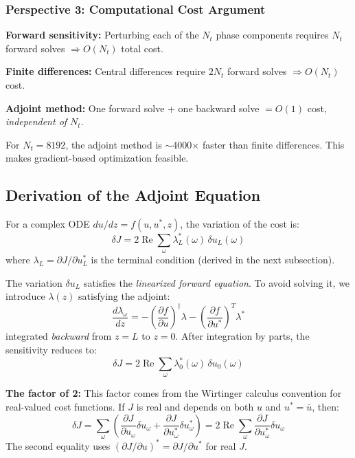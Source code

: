 \documentclass[12pt,a4paper]{article}
\newcommand{\pdv}[2]{\frac{\partial #1}{\partial #2}}
\newcommand{\dv}[2]{\frac{d #1}{d #2}}
\newcommand{\Real}{\operatorname{Re}}
\theoremstyle{definition}
\begin{document}
\subsubsection{Perspective 3: Computational Cost Argument}

\textbf{Forward sensitivity:} Perturbing each of the $N_t$ phase components requires $N_t$ forward solves $\Rightarrow O(N_t)$ total cost.

\textbf{Finite differences:} Central differences require $2N_t$ forward solves $\Rightarrow O(N_t)$ cost.

\textbf{Adjoint method:} One forward solve + one backward solve $= O(1)$ cost, \emph{independent of $N_t$}.

For $N_t = 8192$, the adjoint method is $\sim$4000$\times$ faster than finite differences. This makes gradient-based optimization feasible.

\subsection{Derivation of the Adjoint Equation}
\label{sec:adjoint_derivation}

For a complex ODE $du/dz = f(u, u^*, z)$, the variation of the cost is:
\begin{equation}
\delta J = 2\Real\sum_\omega \lambda_L^*(\omega)\,\delta u_L(\omega)
\end{equation}
where $\lambda_L = \partial J / \partial u_L^*$ is the terminal condition (derived in the next subsection).

The variation $\delta u_L$ satisfies the \emph{linearized forward equation}. To avoid solving it, we introduce $\lambda(z)$ satisfying the adjoint:
\begin{equation}
\boxed{\dv{\lambda_\omega}{z} = -\left(\pdv{f}{u}\right)^\dagger \lambda - \left(\pdv{f}{u^*}\right)^T \lambda^*}
\label{eq:adjoint_general}
\end{equation}
integrated \emph{backward} from $z=L$ to $z=0$. After integration by parts, the sensitivity reduces to:
\begin{equation}
\delta J = 2\Real\sum_\omega \lambda_0^*(\omega)\,\delta u_0(\omega)
\label{eq:sensitivity}
\end{equation}

\textbf{The factor of 2:} This factor comes from the Wirtinger calculus convention for real-valued cost functions. If $J$ is real and depends on both $u$ and $u^* = \bar{u}$, then:
\begin{equation}
\delta J = \sum_\omega \left(\pdv{J}{u_\omega}\delta u_\omega + \pdv{J}{u_\omega^*}\delta u_\omega^*\right) = 2\Real\sum_\omega \pdv{J}{u_\omega^*}\delta u_\omega
\end{equation}
The second equality uses $(\partial J/\partial u)^* = \partial J/\partial u^*$ for real $J$.
\end{document}
